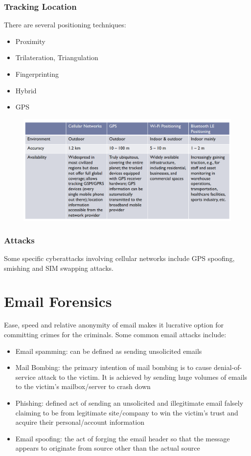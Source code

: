 \documentclass[10pt,a4paper]{report}
\begin{document}
\subsubsection{Tracking Location}
There are several positioning techniques:
\begin{itemize}
\item Proximity
\item Trilateration, Triangulation
\item Fingerprinting
\item Hybrid
\item GPS
\end{itemize}
\begin{figure}[H]
\centering
\includegraphics[scale=0.4]{20.png}
\end{figure}
\subsubsection{Attacks}
Some specific cyberattacks involving cellular networks include GPS spoofing, smishing and SIM swapping attacks.
\section{Email Forensics}
Ease, speed and relative anonymity of email makes it lucrative option for committing crimes for the criminals. Some common email attacks include:
\begin{itemize}
\item Email spamming: can be defined as sending unsolicited emails
\item Mail Bombing: the primary intention of mail bombing is to cause denial-of-service attack to the victim. It is achieved by sending huge volumes of emails to the victim's mailbox/server to crash down
\item Phishing: defined act of sending an unsolicited and illegitimate email falsely claiming to be from legitimate site/company to win the victim's trust and acquire their personal/account information
\item Email spoofing: the act of forging the email header so that the message appears to originate from source other than the actual source
\end{itemize}
\end{document}
